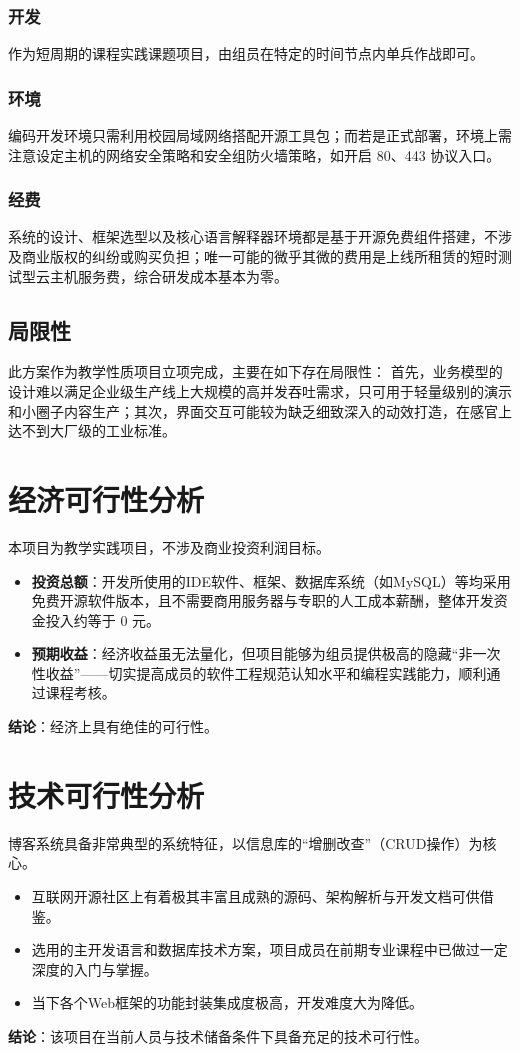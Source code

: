 \documentclass[12pt, a4paper]{ctexart}
\begin{document}
\subsubsection{开发}
作为短周期的课程实践课题项目，由组员在特定的时间节点内单兵作战即可。

\subsubsection{环境}
编码开发环境只需利用校园局域网络搭配开源工具包；而若是正式部署，环境上需注意设定主机的网络安全策略和安全组防火墙策略，如开启 80、443 协议入口。

\subsubsection{经费}
系统的设计、框架选型以及核心语言解释器环境都是基于开源免费组件搭建，不涉及商业版权的纠纷或购买负担；唯一可能的微乎其微的费用是上线所租赁的短时测试型云主机服务费，综合研发成本基本为零。

\subsection{局限性}
此方案作为教学性质项目立项完成，主要在如下存在局限性：
首先，业务模型的设计难以满足企业级生产线上大规模的高并发吞吐需求，只可用于轻量级别的演示和小圈子内容生产；其次，界面交互可能较为缺乏细致深入的动效打造，在感官上达不到大厂级的工业标准。

\section{经济可行性分析}
本项目为教学实践项目，不涉及商业投资利润目标。
\begin{itemize}
    \item \textbf{投资总额}：开发所使用的IDE软件、框架、数据库系统（如MySQL）等均采用免费开源软件版本，且不需要商用服务器与专职的人工成本薪酬，整体开发资金投入约等于 0 元。
    \item \textbf{预期收益}：经济收益虽无法量化，但项目能够为组员提供极高的隐藏“非一次性收益”——切实提高成员的软件工程规范认知水平和编程实践能力，顺利通过课程考核。
\end{itemize}
\textbf{结论}：经济上具有绝佳的可行性。

\section{技术可行性分析}
博客系统具备非常典型的系统特征，以信息库的“增删改查”（CRUD操作）为核心。
\begin{itemize}
    \item 互联网开源社区上有着极其丰富且成熟的源码、架构解析与开发文档可供借鉴。
    \item 选用的主开发语言和数据库技术方案，项目成员在前期专业课程中已做过一定深度的入门与掌握。
    \item 当下各个Web框架的功能封装集成度极高，开发难度大为降低。
\end{itemize}
\textbf{结论}：该项目在当前人员与技术储备条件下具备充足的技术可行性。
\end{document}
